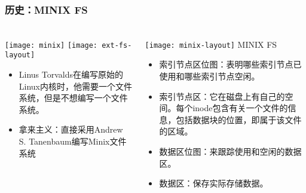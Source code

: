\begin{frame}[fragile]
	\frametitle{历史：MINIX FS}
	
	\frametitle{ }
	\begin{columns}[t]
		\begin{column}{.4\textwidth}
			\texttt{[image: minix]}
			\texttt{[image: ext-fs-layout]}
			
			\begin{itemize}
				\item Linus Torvalds在编写原始的Linux内核时，他需要一个文件系统，但是不想编写一个文件系统。
				\item 拿来主义：直接采用Andrew S. Tanenbaum编写Minix文件系统
			\end{itemize}
			
		\end{column}
		
		\begin{column}{.6\textwidth}			
			\texttt{[image: minix-layout]}
			MINIX FS
			\begin{itemize}
				\item 索引节点区位图：表明哪些索引节点已使用和哪些索引节点空闲。
				\item 索引节点区：它在磁盘上有自己的空间。每个inode包含有关一个文件的信息，包括数据块的位置，即属于该文件的区域。
				\item 数据区位图：来跟踪使用和空闲的数据区。
				\item 数据区：保存实际存储数据。
			\end{itemize}
			
		\end{column}
	\end{columns}
	
\end{frame}


